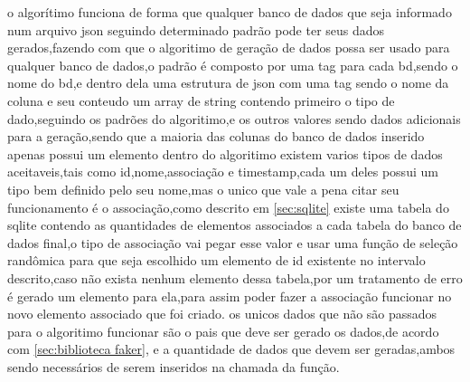 \documentclass[
	12pt,				%
	openright,			%
	oneside,			%
	a4paper,			%
	english,			%
	french,				%
	spanish,			%
	brazil,				%
	]{abntex2}
\begin{document}
o algorítimo funciona de forma que qualquer banco de dados que seja informado num arquivo json seguindo determinado padrão pode ter seus dados gerados,fazendo com que o algoritimo de geração de dados possa ser usado para qualquer banco de dados,o padrão é composto por uma tag para cada bd,sendo o nome do bd,e dentro dela uma estrutura de json com uma tag sendo o nome da coluna e seu conteudo um array de string contendo primeiro o tipo de dado,seguindo os padrões do algoritimo,e os outros valores sendo dados adicionais para a geração,sendo que a maioria das colunas do banco de dados inserido apenas possui um elemento\newline
dentro do algoritimo existem varios tipos de dados aceitaveis,tais como id,nome,associação e timestamp,cada um deles possui um tipo bem definido pelo seu nome,mas o unico que vale a pena citar seu funcionamento é o associação,como descrito em \autoref{sec:sqlite} existe uma tabela do sqlite contendo as quantidades de elementos associados a cada tabela do banco de dados final,o tipo de associação vai pegar esse valor e usar uma função de seleção randômica para que seja escolhido um elemento de id existente no intervalo descrito,caso não exista nenhum elemento dessa tabela,por um tratamento de erro é gerado um elemento para ela,para assim poder fazer a associação funcionar no novo elemento associado que foi criado.\newline
os unicos dados que não são passados para o algoritimo funcionar são o pais que deve ser gerado os dados,de acordo com \autoref{sec:biblioteca faker}, e a quantidade de dados que devem ser geradas,ambos sendo necessários de serem inseridos na chamada da função.
\end{document}
